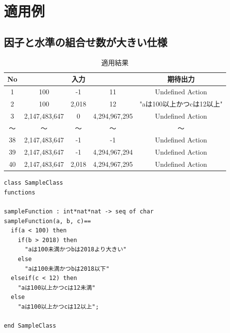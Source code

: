 \documentclass[uplatex, report, a4j, 10pt]{jsbook}
\begin{document}
\chapter{適用例}\label{cha:Indication}
\section{因子と水準の組合せ数が大きい仕様}

\begin{table}[t]
  \begin{center}
    \caption{適用結果}
    \label{tab:pict4javaTekiyourei}
    \begin{tabular}{c|c|c|c|c}
      No & \multicolumn{3}{|c|}{入力} & 期待出力                                 \\
      \hline
      \hline
      1  & 100                        & -1       & 11         & Undefined Action \\
      2  & 100                        & 2,018     & 12         & "aは100以上かつcは12以上" \\
      3  & 2,147,483,647                 & 0        & 4,294,967,295 & Undefined Action \\
      〜 & 〜                         & 〜       & 〜         & 〜 \\
      38 & 2,147,483,647                 & -1       & -1         & Undefined Action \\
      39 & 2,147,483,647                 & -1       & 4,294,967,294 & Undefined Action \\
      40 & 2,147,483,647                 & 2,018     & 4,294,967,295 & Undefined Action \\
      \hline
    \end{tabular}
  \end{center}
\end{table}

\lstset{language=}
\begin{lstlisting}[caption=因子が3、水準が（6 6 6）の関数を持つVDM++仕様。,label=fig:pict4javaSampleVdm]
class SampleClass
functions

sampleFunction : int*nat*nat -> seq of char
sampleFunction(a, b, c)==
  if(a < 100) then
    if(b > 2018) then
      "aは100未満かつbは2018より大きい"
    else
      "aは100未満かつbは2018以下"
  elseif(c < 12) then
    "aは100以上かつcは12未満"
  else
    "aは100以上かつcは12以上";

end SampleClass
\end{lstlisting}
\end{document}
